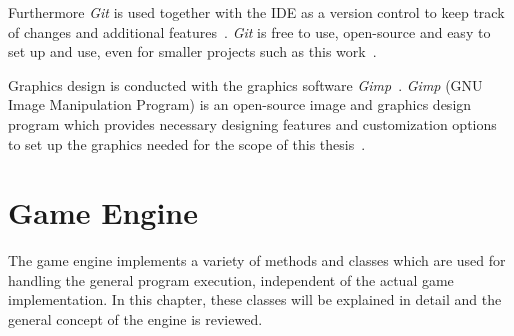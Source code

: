 Furthermore \textit{Git} is used together with the \gls{IDE} as a version control to keep track of changes and additional
features~\cite{git}.
\textit{Git} is free to use, open-source and easy to set up and use, even for smaller projects such as this work~\cite{git}.

Graphics design is conducted with the graphics software \textit{Gimp}~\cite{gimp}.
\textit{Gimp} (GNU Image Manipulation Program) is an open-source image and graphics design program which provides
necessary designing features and customization options to set up the graphics needed for the scope of this thesis~\cite{gimp}.
\section{Game Engine}\label{sec:game}
The game engine implements a variety of methods and classes which are used for handling the general program execution, independent of the actual game implementation.
In this chapter, these classes will be explained in detail and the general concept of the engine is reviewed.

